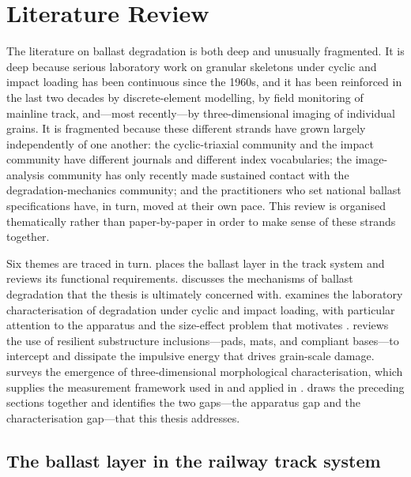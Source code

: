 \chapter{Literature Review}
\label{ch:literature}

The literature on ballast degradation is both deep and unusually fragmented. It is deep because serious laboratory work on granular skeletons under cyclic and impact loading has been continuous since the 1960s, and it has been reinforced in the last two decades by discrete-element modelling, by field monitoring of mainline track, and---most recently---by three-dimensional imaging of individual grains. It is fragmented because these different strands have grown largely independently of one another: the cyclic-triaxial community and the impact community have different journals and different index vocabularies; the image-analysis community has only recently made sustained contact with the degradation-mechanics community; and the practitioners who set national ballast specifications have, in turn, moved at their own pace. This review is organised thematically rather than paper-by-paper in order to make sense of these strands together.

Six themes are traced in turn.  places the ballast layer in the track system and reviews its functional requirements.  discusses the mechanisms of ballast degradation that the thesis is ultimately concerned with.  examines the laboratory characterisation of degradation under cyclic and impact loading, with particular attention to the apparatus and the size-effect problem that motivates .  reviews the use of resilient substructure inclusions---pads, mats, and compliant bases---to intercept and dissipate the impulsive energy that drives grain-scale damage.  surveys the emergence of three-dimensional morphological characterisation, which supplies the measurement framework used in  and applied in .  draws the preceding sections together and identifies the two gaps---the apparatus gap and the characterisation gap---that this thesis addresses.

\section{The ballast layer in the railway track system}
\label{sec:ballast-layer}


